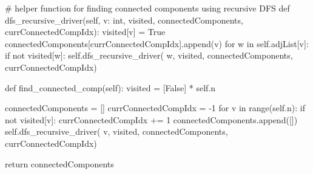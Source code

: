 \begin{python}
    # helper function for finding connected components using recursive DFS
    def dfs_recursive_driver(self, v: int,
                             visited,
                             connectedComponents,
                             currConnectedCompIdx):
        visited[v] = True
        connectedComponents[currConnectedCompIdx].append(v)
        for w in self.adjList[v]:
            if not visited[w]:
                self.dfs_recursive_driver(
                    w, visited, connectedComponents, currConnectedCompIdx)

    def find_connected_comp(self):
        visited = [False] * self.n

        connectedComponents = []
        currConnectedCompIdx = -1
        for v in range(self.n):
            if not visited[v]:
                currConnectedCompIdx += 1
                connectedComponents.append([])
                self.dfs_recursive_driver(
                    v, visited, connectedComponents, currConnectedCompIdx)

        return connectedComponents
\end{python}

